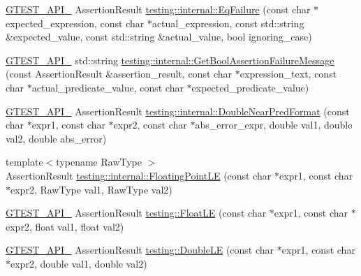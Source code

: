 \begin{DoxyCompactItemize}
\item 
\mbox{\hyperlink{_obj__test_2lib_2googletest-release-1_88_81_2googletest_2include_2gtest_2internal_2gtest-port_8h_aa73be6f0ba4a7456180a94904ce17790}{G\+T\+E\+S\+T\+\_\+\+A\+P\+I\+\_\+}} Assertion\+Result \mbox{\hyperlink{namespacetesting_1_1internal_a08725846ff184d3e79bcf5be4df19157}{testing\+::internal\+::\+Eq\+Failure}} (const char $\ast$expected\+\_\+expression, const char $\ast$actual\+\_\+expression, const std\+::string \&expected\+\_\+value, const std\+::string \&actual\+\_\+value, bool ignoring\+\_\+case)
\item 
\mbox{\hyperlink{_obj__test_2lib_2googletest-release-1_88_81_2googletest_2include_2gtest_2internal_2gtest-port_8h_aa73be6f0ba4a7456180a94904ce17790}{G\+T\+E\+S\+T\+\_\+\+A\+P\+I\+\_\+}} std\+::string \mbox{\hyperlink{namespacetesting_1_1internal_a5fd6e5dc9eb20ab3c3a80e24d89dfac6}{testing\+::internal\+::\+Get\+Bool\+Assertion\+Failure\+Message}} (const Assertion\+Result \&assertion\+\_\+result, const char $\ast$expression\+\_\+text, const char $\ast$actual\+\_\+predicate\+\_\+value, const char $\ast$expected\+\_\+predicate\+\_\+value)
\item 
\mbox{\hyperlink{_obj__test_2lib_2googletest-release-1_88_81_2googletest_2include_2gtest_2internal_2gtest-port_8h_aa73be6f0ba4a7456180a94904ce17790}{G\+T\+E\+S\+T\+\_\+\+A\+P\+I\+\_\+}} Assertion\+Result \mbox{\hyperlink{namespacetesting_1_1internal_a4f70b36c624b54c2362aeecc2f05ee8c}{testing\+::internal\+::\+Double\+Near\+Pred\+Format}} (const char $\ast$expr1, const char $\ast$expr2, const char $\ast$abs\+\_\+error\+\_\+expr, double val1, double val2, double abs\+\_\+error)
\item 
{\footnotesize template$<$typename Raw\+Type $>$ }\\Assertion\+Result \mbox{\hyperlink{namespacetesting_1_1internal_a17b52b6b1f81f6dcad5cc4d12e5173a6}{testing\+::internal\+::\+Floating\+Point\+LE}} (const char $\ast$expr1, const char $\ast$expr2, Raw\+Type val1, Raw\+Type val2)
\item 
\mbox{\hyperlink{_obj__test_2lib_2googletest-release-1_88_81_2googletest_2include_2gtest_2internal_2gtest-port_8h_aa73be6f0ba4a7456180a94904ce17790}{G\+T\+E\+S\+T\+\_\+\+A\+P\+I\+\_\+}} Assertion\+Result \mbox{\hyperlink{namespacetesting_a2c9a2a391c72a7b02ea3024586e33af0}{testing\+::\+Float\+LE}} (const char $\ast$expr1, const char $\ast$expr2, float val1, float val2)
\item 
\mbox{\hyperlink{_obj__test_2lib_2googletest-release-1_88_81_2googletest_2include_2gtest_2internal_2gtest-port_8h_aa73be6f0ba4a7456180a94904ce17790}{G\+T\+E\+S\+T\+\_\+\+A\+P\+I\+\_\+}} Assertion\+Result \mbox{\hyperlink{namespacetesting_ae10e2bb304b74abd1b06a2d912a8b43b}{testing\+::\+Double\+LE}} (const char $\ast$expr1, const char $\ast$expr2, double val1, double val2)

\end{DoxyCompactItemize}
